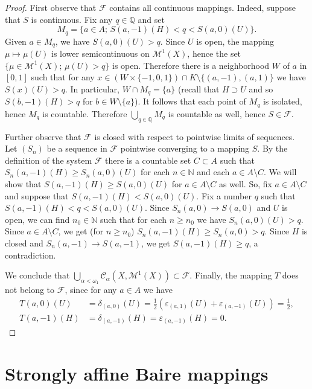 \documentclass{amsart}
\numberwithin{equation}{section}
\theoremstyle{definition}
\def\C{\mathcal C}
\def\F{\mathcal F}
\def\M{\mathcal M}
\def\ep{\varepsilon}
\def\en{\mathbb N}
\def\qe{\mathbb Q}
\newcommand{\setsep}{;\,}
\begin{document}
\begin{proof}
First observe that $\F$ contains all continuous mappings. Indeed, suppose that $S$ is continuous. Fix any $q\in\qe$ and set
$$M_q= \{a\in A\setsep S(a,-1)(H)<q<S(a,0)(U)\}.$$
Given $a\in M_q$, we have $S(a,0)(U)>q$. Since $U$ is open, the mapping $\mu\mapsto\mu(U)$ is lower semicontinuous on $\M^1(X)$, hence the set $\{\mu\in\M^1(X)\setsep\mu(U)>q\}$ is open. Therefore there is a neighborhood $W$ of $a$ in $[0,1]$ such that for any $x\in (W\times\{-1,0,1\})\cap K\setminus\{(a,-1),(a,1)\}$ we have $S(x)(U)>q$. In particular, $W\cap M_q=\{a\}$ (recall that $H\supset U$ and so $S(b,-1)(H)>q$ for $b\in W\setminus\{a\}$). It follows that each point of $M_q$ is isolated, hence $M_q$ is countable. Therefore $\bigcup_{q\in\qe}M_q$ is countable as well, hence $S\in\F$.

Further observe that $\F$ is closed with respect to pointwise limits of sequences. Let $(S_n)$ be a sequence in $\F$ pointwise converging to a mapping $S$. By the definition of the system $\F$ there is a countable set $C\subset A$ such that  $S_n(a,-1)(H)\ge S_n(a,0)(U)$ for each $n\in\en$ and each $a\in A\setminus C$. We will show that $S(a,-1)(H)\ge S(a,0)(U)$ for $a\in A\setminus C$ as well. So, fix $a\in A\setminus C$ and suppose that $S(a,-1)(H) < S(a,0)(U)$. Fix a number $q$ such that
$S(a,-1)(H) < q < S(a,0)(U)$. Since $S_n(a,0)\to S(a,0)$ and $U$ is open, we can find $n_0\in\en$ such that for each $n\ge n_0$ we have $S_n(a,0)(U)>q$. Since $a\in A\setminus C$, we get (for $n\ge n_0$) $S_n(a,-1)(H)\ge S_n(a,0)>q$. Since $H$ is closed and $S_n(a,-1)\to S(a,-1)$, we get $S(a,-1)(H)\ge q$, a contradiction.

We conclude that $\bigcup_{\alpha<\omega_1}\C_\alpha(X,\M^1(X))\subset\F$. Finally, the mapping $T$ does not belong to $\F$, since for any $a\in A$ we have
$$\begin{aligned}
T(a,0)(U)&=\delta_{(a,0)}(U)=\frac12(\ep_{(a,1)}(U)+\ep_{(a,-1)}(U))=\frac12,\\
T(a,-1)(H)&=\delta_{(a,-1)}(H)=\ep_{(a,-1)}(H)=0.
\end{aligned}$$
\end{proof}






\section{Strongly affine Baire mappings}\label{Sec:affbaire}
\end{document}
